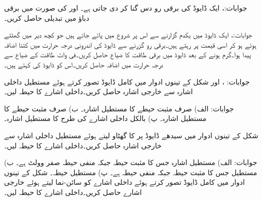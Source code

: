 جوابات:، 
ایک ڈایوڈ کی برقی رو دس گنا کر دی جاتی ہے۔ اور  کی صورت میں برقی دباؤ میں تبدیلی حاصل کریں۔

جوابات:، 
ایک ڈایوڈ میں یکدم  گزارنے سے اس پر شروع میں  پائے جاتے ہیں جو کچھ دیر میں گھٹتے ہوئے  ہو کر اسی قیمت پر رہتے ہیں۔برقی رو گزرنے سے ڈایوڈ کی اندرونی درجہ حرارت میں کتنا اضافہ پیدا ہوا۔گرم ہونے کے بعد ڈایوڈ میں برقی طاقت کا ضیاع حاصل کریں۔فی واٹ طاقت کے ضیاع سے درجہ حرارت میں اضافہ حاصل کریں۔اس کو ڈایوڈ کی 
 کہتے ہیں۔

جوابات: ،  اور 
شکل  کے تینوں ادوار میں کامل ڈایوڈ تصور کرتے ہوئے مستطیل داخلی اشارہ  سے  خارجی اشارہ  حاصل کریں۔داخلی اشارے کا حیطہ  لیں۔ 


جوابات: الف) صرف مثبت  حیطے کا مستطیل اشارہ۔ ب) صرف مثبت  حیطے کا مستطیل اشارہ۔ پ) بالکل داخلی اشارے کی طرح  کا مستطیل اشارہ۔

شکل  کے تینوں ادوار میں سیدھے ڈایوڈ پر  کا گھٹاو لیتے ہوئے  مستطیل داخلی اشارہ  سے  خارجی اشارہ  حاصل کریں۔داخلی اشارے کا حیطہ  لیں۔ 

جوابات: الف) مستطیل اشارہ جس کا مثبت حیطہ   جبکہ منفی حیطہ صفر وولٹ ہے۔ ب) مستطیل جس کا مثبت حیطہ  جبکہ منفی حیطہ  ہے۔ پ) مستطیل  حیطہ۔
شکل  کے تینوں ادوار میں کامل ڈایوڈ تصور کرتے ہوئے داخلی اشارے  کو سائن-نما لیتے ہوئے خارجی اشارے  حاصل کریں۔داخلی اشارے کا حیطہ  لیں۔ 

